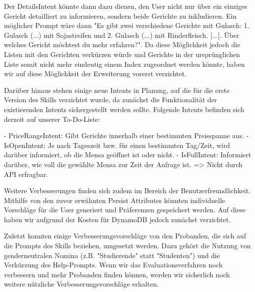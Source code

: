 \documentclass[12pt]{article}
\begin{document}
Der DetailsIntent könnte dann dazu dienen, den User nicht nur über ein einziges Gericht detailliert zu informieren, sondern beide Gerichte zu inkludieren. Ein möglicher Prompt wäre dann "Es gibt zwei verschiedene Gerichte mit Gulasch: 1. Gulasch (...) mit Sojastreifen und 2. Gulasch (...) mit Rinderfleisch. [...]. Über welches Gericht möchtest du mehr erfahren?". Da diese Möglichkeit jedoch die Listen mit den Gerichten verkürzen würde und Gerichte in der ursprünglichen Liste somit nicht mehr eindeutig einem Index zugeordnet werden könnte, haben wir auf diese Möglichkeit der Erweiterung vorerst verzichtet.

Darüber hinaus stehen einige neue Intents in Planung, auf die für die erste Version des Skills verzichtet wurde, da zunächst die Funktionalität der existierenden Intents sichergestellt werden sollte. Folgende Intents befinden sich derzeit auf unserer To-Do-Liste:

- PriceRangeIntent: Gibt Gerichte innerhalb einer bestimmten Preisspanne aus.
- IsOpenIntent: Je nach Tageszeit bzw. für einen bestimmten Tag/Zeit, wird darüber informiert, ob die Mensa geöffnet ist oder nicht.
- IsFullIntent: Informiert darüber, wie voll die gewählte Mensa zur Zeit der Anfrage ist. => Nicht durch API erfragbar.

Weitere Verbesserungen finden sich zudem im Bereich der Benutzerfreundlichkeit. Mithilfe von den zuvor erwähnten Persist Attributes könnten individuelle Vorschläge für die User generiert und Präferenzen gespeichert werden. Auf diese haben wir aufgrund der Kosten für DynamoDB jedoch zunächst verzichtet.

Zuletzt konnten einige Verbesserungsvorschläge von den Probanden, die sich auf die Prompts des Skills beziehen, umgesetzt werden. Dazu gehört die Nutzung von genderneutralen Nomina (z.B. "Studierende" statt "Studenten") und die Verkürzung des Help-Prompts. Wenn wir das Evaluationsverfahren noch verbessern und mehr Probanden finden können, werden wir sicherlich noch weitere nützliche Verbesserungsvorschläge erhalten.

\newpage
{}







  
  
\end{document}
